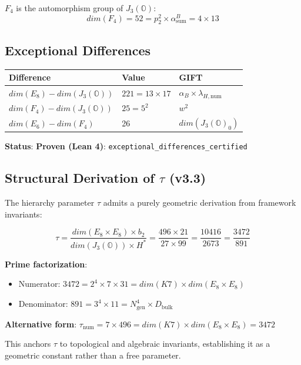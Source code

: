 \documentclass[11pt,a4paper]{article}
\newcommand{\E}{\mathrm{E}}
\newcommand{\Kseven}{K_7}
\newcommand{\dimE}{\mathrm{dim}}
\newcommand{\proven}{\textsc{Proven}}
\def\Kseven{K7}%
\def\E{E}%
\def\dimE{dim}%
\def\proven{Proven}%
\begin{document}
$F_4$ is the automorphism group of $J_3(\mathbb{O})$:
$$\dimE(F_4) = 52 = p_2^2 \times \alpha_{\text{sum}}^B = 4 \times 13$$

\subsection{Exceptional Differences}

\begin{table}[H]
\centering
\begin{tabular}{lll}
\toprule
Difference & Value & GIFT \\
\midrule
$\dimE(\E_8) - \dimE(J_3(\mathbb{O}))$ & $221 = 13 \times 17$ & $\alpha_B \times \lambda_{H,\text{num}}$ \\
$\dimE(F_4) - \dimE(J_3(\mathbb{O}))$ & $25 = 5^2$ & $w^2$ \\
$\dimE(\E_6) - \dimE(F_4)$ & 26 & $\dimE(J_3(\mathbb{O})_0)$ \\
\bottomrule
\end{tabular}
\end{table}

\textbf{Status}: \textbf{\proven{} (Lean 4)}: \texttt{exceptional\_differences\_certified}

\subsection{Structural Derivation of $\tau$ (v3.3)}

The hierarchy parameter $\tau$ admits a purely geometric derivation from framework invariants:

$$\tau = \frac{\dimE(\E_8 \times \E_8) \times b_2}{\dimE(J_3(\mathbb{O})) \times H^*} = \frac{496 \times 21}{27 \times 99} = \frac{10416}{2673} = \frac{3472}{891}$$

\textbf{Prime factorization}:
\begin{itemize}
\item Numerator: $3472 = 2^4 \times 7 \times 31 = \dimE(\Kseven) \times \dimE(\E_8\times\E_8)$
\item Denominator: $891 = 3^4 \times 11 = N_{\mathrm{gen}}^4 \times D_{\text{bulk}}$
\end{itemize}

\textbf{Alternative form}: $\tau_{\text{num}} = 7 \times 496 = \dimE(\Kseven) \times \dimE(\E_8\times\E_8) = 3472$

This anchors $\tau$ to topological and algebraic invariants, establishing it as a geometric constant rather than a free parameter.
\end{document}
